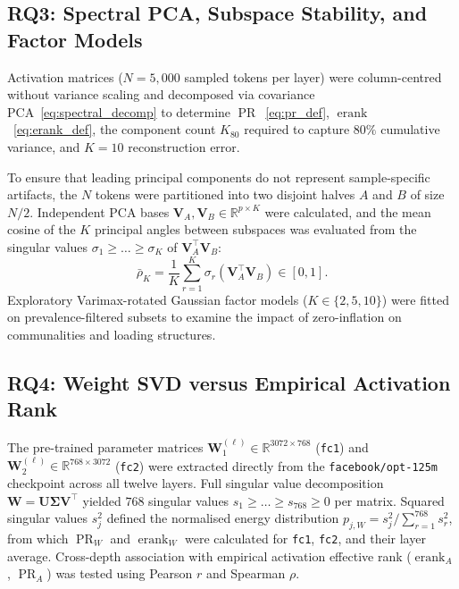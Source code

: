 \documentclass[12pt, a4paper, oneside]{report}
\theoremstyle{definition}
\newcommand{\mat}[1]{\mathbf{#1}}
\newcommand{\erank}{\operatorname{erank}}
\newcommand{\PR}{\operatorname{PR}}
\newcommand{\R}{\mathbb{R}}
\begin{document}
\subsection{RQ3: Spectral PCA, Subspace Stability, and Factor Models}

Activation matrices ($N = 5{,}000$ sampled tokens per layer) were column-centred without variance scaling and decomposed via covariance PCA~\eqref{eq:spectral_decomp} to determine $\PR$~\eqref{eq:pr_def}, $\erank$~\eqref{eq:erank_def}, the component count $K_{80}$ required to capture $80\%$ cumulative variance, and $K = 10$ reconstruction error.

To ensure that leading principal components do not represent sample-specific artifacts, the $N$ tokens were partitioned into two disjoint halves $A$ and $B$ of size $N/2$. Independent PCA bases $\mat{V}_A, \mat{V}_B \in \R^{p \times K}$ were calculated, and the mean cosine of the $K$ principal angles between subspaces was evaluated from the singular values $\sigma_1 \ge \dots \ge \sigma_K$ of $\mat{V}_A^\top \mat{V}_B$:
\begin{equation}
    \bar{\rho}_K = \frac{1}{K}\sum_{r=1}^{K} \sigma_r\!\left(\mat{V}_A^\top \mat{V}_B\right) \in [0, 1].
    \label{eq:subspace_stability}
\end{equation}
Exploratory Varimax-rotated Gaussian factor models ($K \in \{2, 5, 10\}$) were fitted on prevalence-filtered subsets to examine the impact of zero-inflation on communalities and loading structures.

\subsection{RQ4: Weight SVD versus Empirical Activation Rank}

The pre-trained parameter matrices $\mat{W}_1^{(\ell)} \in \R^{3072 \times 768}$ (\texttt{fc1}) and $\mat{W}_2^{(\ell)} \in \R^{768 \times 3072}$ (\texttt{fc2}) were extracted directly from the \texttt{facebook/opt-125m} checkpoint across all twelve layers. Full singular value decomposition $\mat{W} = \mat{U}\mat{\Sigma}\mat{V}^\top$ yielded $768$ singular values $s_1 \ge \dots \ge s_{768} \ge 0$ per matrix. Squared singular values $s_j^2$ defined the normalised energy distribution $p_{j,W} = s_j^2 / \sum_{r=1}^{768} s_r^2$, from which $\PR_W$ and $\erank_W$ were calculated for \texttt{fc1}, \texttt{fc2}, and their layer average. Cross-depth association with empirical activation effective rank ($\erank_A$, $\PR_A$) was tested using Pearson $r$ and Spearman $\rho$.
\end{document}
